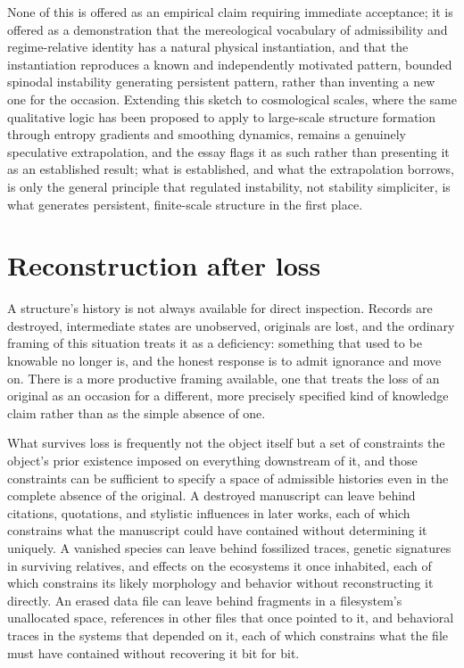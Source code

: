 \documentclass[11pt]{article}
\begin{document}
None of this is offered as an empirical claim requiring immediate acceptance; it is offered as a demonstration that the mereological vocabulary of admissibility and regime-relative identity has a natural physical instantiation, and that the instantiation reproduces a known and independently motivated pattern, bounded spinodal instability generating persistent pattern, rather than inventing a new one for the occasion. Extending this sketch to cosmological scales, where the same qualitative logic has been proposed to apply to large-scale structure formation through entropy gradients and smoothing dynamics, remains a genuinely speculative extrapolation, and the essay flags it as such rather than presenting it as an established result; what is established, and what the extrapolation borrows, is only the general principle that regulated instability, not stability simpliciter, is what generates persistent, finite-scale structure in the first place.

\section{Reconstruction after loss}

A structure's history is not always available for direct inspection. Records are destroyed, intermediate states are unobserved, originals are lost, and the ordinary framing of this situation treats it as a deficiency: something that used to be knowable no longer is, and the honest response is to admit ignorance and move on. There is a more productive framing available, one that treats the loss of an original as an occasion for a different, more precisely specified kind of knowledge claim rather than as the simple absence of one.

What survives loss is frequently not the object itself but a set of constraints the object's prior existence imposed on everything downstream of it, and those constraints can be sufficient to specify a space of admissible histories even in the complete absence of the original. A destroyed manuscript can leave behind citations, quotations, and stylistic influences in later works, each of which constrains what the manuscript could have contained without determining it uniquely. A vanished species can leave behind fossilized traces, genetic signatures in surviving relatives, and effects on the ecosystems it once inhabited, each of which constrains its likely morphology and behavior without reconstructing it directly. An erased data file can leave behind fragments in a filesystem's unallocated space, references in other files that once pointed to it, and behavioral traces in the systems that depended on it, each of which constrains what the file must have contained without recovering it bit for bit.
\end{document}
